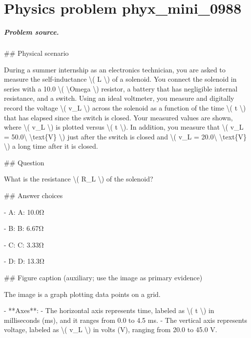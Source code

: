 
\chapter{Physics problem phyx\_mini\_0988}
\label{ch:PhyXMiniProblems_problem_phyx_mini_0988}

\paragraph{Problem source.}
\#\# Physical scenario

During a summer internship as an electronics technician, you are asked to measure the self-inductance \textbackslash{}( L \textbackslash{}) of a solenoid. You connect the solenoid in series with a 10.0 \textbackslash{}( \textbackslash{}Omega \textbackslash{}) resistor, a battery that has negligible internal resistance, and a switch. Using an ideal voltmeter, you measure and digitally record the voltage \textbackslash{}( v\_L \textbackslash{}) across the solenoid as a function of the time \textbackslash{}( t \textbackslash{}) that has elapsed since the switch is closed. Your measured values are shown, where \textbackslash{}( v\_L \textbackslash{}) is plotted versus \textbackslash{}( t \textbackslash{}). In addition, you measure that \textbackslash{}( v\_L = 50.0\textbackslash{} \textbackslash{}text\{V\} \textbackslash{}) just after the switch is closed and \textbackslash{}( v\_L = 20.0\textbackslash{} \textbackslash{}text\{V\} \textbackslash{}) a long time after it is closed.

\#\# Question

What is the resistance \textbackslash{}( R\_L \textbackslash{}) of the solenoid?

\#\# Answer choices

- A: A: 10.0Ω

- B: B: 6.67Ω

- C: C: 3.33Ω

- D: D: 13.3Ω

\#\# Figure caption (auxiliary; use the image as primary evidence)

The image is a graph plotting data points on a grid. 

- **Axes**: 
  - The horizontal axis represents time, labeled as \textbackslash{}( t \textbackslash{}) in milliseconds (ms), and it ranges from 0.0 to 4.5 ms.
  - The vertical axis represents voltage, labeled as \textbackslash{}( v\_L \textbackslash{}) in volts (V), ranging from 20.0 to 45.0 V.

